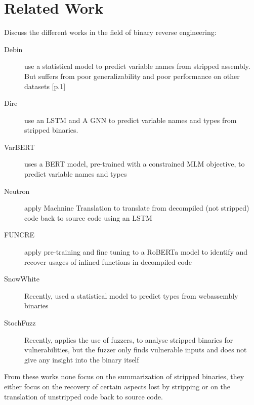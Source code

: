 \chapter{Related Work}
\label{relatedWork}
Discuss the different works in the field of binary reverse engineering:

\begin{description}
    \item[Debin] \textcite{Debin} use a statistical model to predict variable names from stripped assembly. But suffers from poor generalizability and poor performance on other datasets \cite{VarBERT}[p.1]
    \item[Dire] \textcite{Dire} use an LSTM and A GNN to predict variable names and types from stripped binaries.
    \item[VarBERT] \textcite{VarBERT} uses a BERT model, pre-trained with a constrained MLM objective, to predict variable names and types
    \item[Neutron] \textcite{Neutron} apply Machnine Translation to translate from decompiled (not stripped) code back to source code using an LSTM  
    \item[FUNCRE] \textcite{InlinedFunc} apply pre-training and fine tuning to a RoBERTa model to identify and recover usages of inlined functions in decompiled code
    \item[SnowWhite] Recently, \textcite{SnowWhite} used a statistical model to predict types from webassembly binaries
    \item[StochFuzz] Recently, \textcite{StochFuzz} applies the use of fuzzers, to analyse stripped binaries for vulnerabilities, but the fuzzer only finds vulnerable inputs and does not give any insight into the binary itself
\end{description}

From these works none focus on the summarization of stripped binaries, they either focus on the recovery of certain aspects lost by stripping or on the translation of unstripped code back to source code.